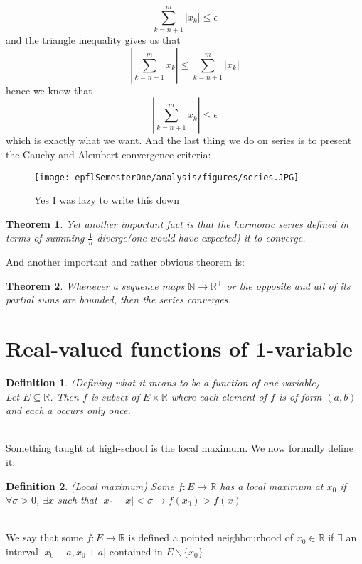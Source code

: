 \documentclass[titlepage]{article}
\newtheorem{theorem}{Theorem}[section]
\newtheorem{definition}{Definition}
\numberwithin{equation}{subsection}
\begin{document}
$$ \sum_{k=n+1}^{m} |x_{k}| \leq \epsilon$$ and the triangle inequality gives us that $$ |\sum_{k=n+1}^{m} x_{k}| \leq \sum_{k=n+1}^{m} |x_{k}| $$ hence we know that $$  |\sum_{k=n+1}^{m} x_{k}| \leq \epsilon$$ which is exactly what we want. 
And the last thing we do on series is to present the Cauchy and Alembert convergence criteria:

\begin{figure}[H]
    \centering
    \texttt{[image: epflSemesterOne/analysis/figures/series.JPG]}
    \caption{Yes I was lazy to write this down}
    \label{fig:my_label}
\end{figure}

\begin{theorem}
Yet another important fact is that the harmonic series defined in terms of summing $\frac{1}{n}$ diverge(one would have expected) it to converge.
\end{theorem}

And another important and rather obvious theorem is:

\begin{theorem}
Whenever a sequence maps $\mathbb{N} \to \mathbb{R^{+}}$ or the opposite and all of its partial sums are bounded, then the series converges.
\end{theorem}

\section{Real-valued functions of 1-variable}
\begin{definition}(Defining what it means to be  a function of one variable)
\\
Let $E\subseteq\mathbb{R}$. Then $f$ is subset of $E\times\mathbb{R}$ where each element of $f$ is of form $(a,b)$ and each $a$ occurs only once. 
\end{definition}
\\

Something taught at high-school is the local maximum. We now formally define it:

\begin{definition}(Local maximum)
Some $f:E\to\mathbb{R}$ has a local maximum at $x_{0}$ if $\forall \sigma > 0$, $\exists x$ such that $|x_{0} - x| < \sigma \rightarrow f(x_{0}) > f(x)$
\end{definition}
\\

We say that some $f:E\to\mathbb{R}$ is defined a pointed neighbourhood of $x_{0} \in \mathbb{R}$ if $\exists$ an interval $]x_{0}-a,x_{0}+a[$ contained in $E\backslash\{x_{0}\}$
\\
\end{document}
